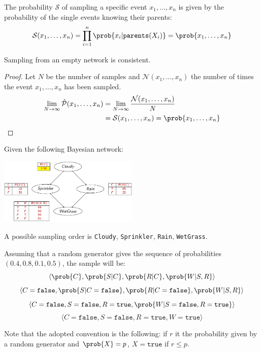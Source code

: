 The probability $\mathcal{S}$ of sampling a specific event $x_1, \dots, x_n$ is given by the
probability of the single events knowing their parents:
\[ \mathcal{S}(x_1, \dots, x_n) = \prod_{i=1}^n \prob{x_i | \texttt{parents}(X_i)} = \prob{x_1, \dots, x_n} \]

\begin{theorem}
    Sampling from an empty network is consistent.

    \begin{proof}
        Let $N$ be the number of samples and 
        $\mathcal{N}(x_1, \dots, x_n)$ the number of times the event $x_1, \dots, x_n$ has been sampled.
        \[
            \begin{split}
                \lim_{N \rightarrow \infty} \hat{\mathcal{P}}(x_1, \dots, x_n) &=
                \lim_{N \rightarrow \infty} \frac{\mathcal{N}(x_1, \dots, x_n)}{N} \\
                &= \mathcal{S}(x_1, \dots, x_n) = 
                \prob{x_1, \dots, x_n}
            \end{split}    
        \]
    \end{proof}
\end{theorem}

\begin{example}
    Given the following Bayesian network:
    \begin{center}
        \includegraphics[width=0.5\textwidth]{img/_approx_infer_example.pdf}
    \end{center}
    
    A possible sampling order is \texttt{Cloudy}, \texttt{Sprinkler}, \texttt{Rain}, \texttt{WetGrass}.

    Assuming that a random generator gives the sequence of probabilities $(0.4, 0.8, 0.1, 0.5)$,
    the sample will be:
    \[ \langle \prob{C}, \prob{S | C}, \prob{R | C}, \prob{W | S, R} \rangle \]
    \[ \langle C=\texttt{false}, \prob{S | C=\texttt{false}}, \prob{R | C=\texttt{false}}, \prob{W | S, R} \rangle \]
    \[ \langle C=\texttt{false}, S=\texttt{false}, R=\texttt{true}, \prob{W | S=\texttt{false}, R=\texttt{true}} \rangle \]
    \[ \langle C=\texttt{false}, S=\texttt{false}, R=\texttt{true}, W=\texttt{true} \rangle \]

    Note that the adopted convention is the following: 
    if $r$ it the probability given by a random generator and $\prob{X} = p$, $X = \texttt{true}$ if $r \leq p$.
\end{example}



